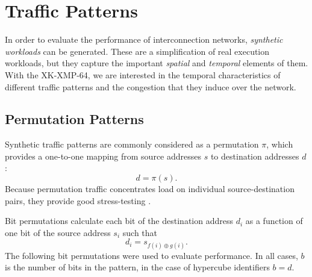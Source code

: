 \section{Traffic Patterns \label{sec:traffic}}

In order to evaluate the performance of interconnection networks, \emph{synthetic
workloads} can be generated. These are a simplification of real execution workloads,
but they capture the important \emph{spatial} and \emph{temporal} elements of
them. With the XK-XMP-64, we are interested in the temporal characteristics of
different traffic patterns and the congestion that they induce over the network.

\subsection{Permutation Patterns}

Synthetic traffic patterns are commonly considered as a permutation $\pi$, which
provides a one-to-one mapping from source addresses $s$ to destination addresses
$d$: $$d = \pi(s).$$ Because permutation traffic concentrates load on individual
source-destination pairs, they provide good stress-testing \cite{dally04}. 

Bit permutations calculate each bit of the destination address $d_i$ as a
function of one bit of the source address $s_i$ such that $$d_i = s_{f(i) \oplus
g(i)}.$$ The following bit permutations were used to evaluate performance.
In all cases, $b$ is the number of bits in the pattern, in the case of
hypercube identifiers $b=d$.

